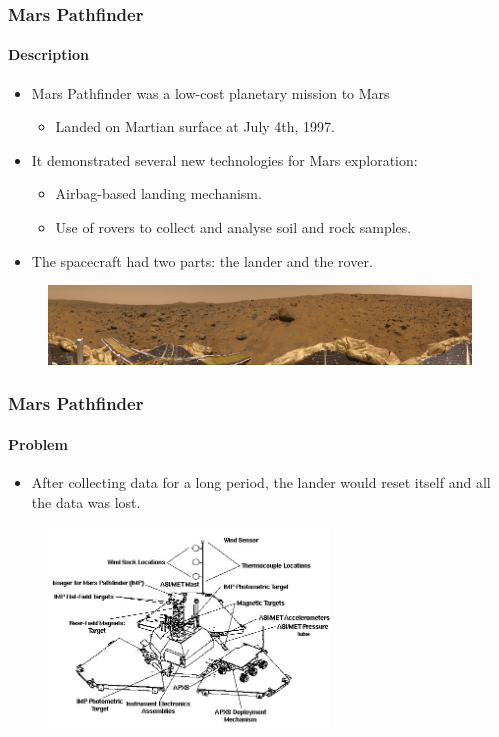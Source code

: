 \begin{frame}[hasprev=false, hasnext=true]
\label{example:mars-pathfinder}
\frametitle{Mars Pathfinder}
\framesubtitle{Description}

\begin{itemize}
	\item Mars Pathfinder was a low-cost planetary mission to Mars
	\begin{itemize}
		\item Landed on Martian surface at July 4th, 1997.
	\end{itemize}

	\item It demonstrated several new technologies for Mars exploration:
	\begin{itemize}
		\item Airbag-based landing mechanism.
		\item Use of rovers to collect and analyse soil and rock samples.
	\end{itemize}

	\item The spacecraft had two parts: the lander and the rover.
\end{itemize}

\begin{figure}
	\centering
	\includegraphics[width=\textwidth]{aux/examples/mars-pathfinder/mars-pathfinder}
\end{figure}
\end{frame}


\begin{frame}[hasprev=true, hasnext=true]
\frametitle{Mars Pathfinder}
\framesubtitle{Problem}

\begin{itemize}
	\item After collecting data for a long period, the lander would reset
	itself and all the data was lost.
\end{itemize}

\begin{figure}
	\centering
	\includegraphics[width=7.5cm]{aux/examples/mars-pathfinder/mars-pathfinder-lander}
\end{figure}
\end{frame}


